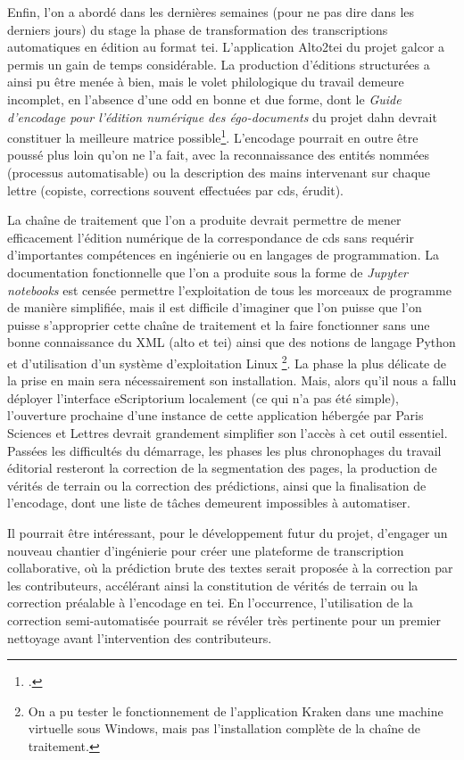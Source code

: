 \documentclass[a4paper,12pt,twoside]{book}
\begin{document}
		Enfin, l'on a abordé dans les dernières semaines (pour ne pas dire dans les derniers jours) du stage la phase de transformation des transcriptions automatiques en édition au format \gls{tei}. L'application Alto2tei du projet \gls{galcor} a permis un gain de temps considérable. La production d'éditions structurées a ainsi pu être menée à bien, mais le volet philologique du travail demeure incomplet, en l'absence d'une \gls{odd} en bonne et due forme, dont le \textit{Guide d'encodage pour l'édition numérique des égo-documents} du projet \gls{dahn} devrait constituer la meilleure matrice possible\footcite{chiffoleauGuideEncodagePour2022}. L'encodage pourrait en outre être poussé plus loin qu'on ne l'a fait, avec la reconnaissance des entités nommées (processus automatisable) ou la description des mains intervenant sur chaque lettre (copiste, corrections souvent effectuées par \gls{cds}, érudit).
		
		La chaîne de traitement que l'on a produite devrait permettre de mener efficacement l'édition numérique de la correspondance de \gls{cds} sans requérir d'importantes compétences en ingénierie ou en langages de programmation. La documentation fonctionnelle que l'on a produite sous la forme de \textit{Jupyter notebooks} est censée permettre l'exploitation de tous les morceaux de programme de manière simplifiée, mais il est difficile d'imaginer que l'on puisse que l'on puisse s'approprier cette chaîne de traitement et la faire fonctionner sans une bonne connaissance du XML (\gls{alto} et \gls{tei}) ainsi que des notions de langage Python et d'utilisation d'un système d'exploitation Linux%
		\footnote{
			On a pu tester le fonctionnement de l'application Kraken dans une machine virtuelle sous Windows, mais pas l'installation complète de la chaîne de traitement.
		}.%
		La phase la plus délicate de la prise en main sera nécessairement son installation. Mais, alors qu'il nous a fallu déployer l'interface eScriptorium localement (ce qui n'a pas été simple), l'ouverture prochaine d'une instance de cette application hébergée par Paris Sciences et Lettres devrait grandement simplifier son l'accès à cet outil essentiel. 	
		Passées les difficultés du démarrage, les phases les plus chronophages du travail éditorial resteront la correction de la \gls{segmentation} des pages, la production de vérités de terrain ou la correction des \glspl{prédiction}, ainsi que la finalisation de l'encodage, dont une liste de tâches demeurent impossibles à automatiser.
		
		Il pourrait être intéressant, pour le développement futur du projet, d'engager un nouveau chantier d'ingénierie pour créer une plateforme de transcription collaborative, où la prédiction brute des textes serait proposée à la correction par les contributeurs, accélérant ainsi la constitution de vérités de terrain ou la correction préalable à l'encodage en \gls{tei}. En l'occurrence, l'utilisation de la correction semi-automatisée pourrait se révéler très pertinente pour un premier nettoyage avant l'intervention des contributeurs.
		
\end{document}

